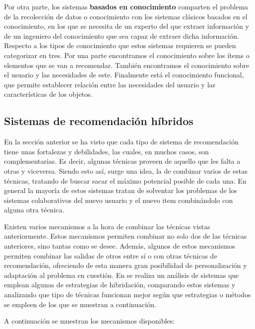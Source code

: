 Por otra parte, los sistemas \textbf{basados en conocimiento} comparten el problema de la recolección de datos o conocimiento con los sistemas clásicos basados en el conocimiento, en los que se necesita de un experto del que extraer información y de un ingeniero del conocimiento que sea capaz de extraer dicha información. Respecto a los tipos de conocimiento que estos sistemas requieren se pueden categorizar en tres. Por una parte encontramos el conocimiento sobre los ítems o elementos que se van a recomendar. También encontramos el conocimiento sobre el usuario y las necesidades de este. Finalmente está el conocimiento funcional, que permite establecer relación entre las necesidades del usuario y las características de los objetos.

\subsection{Sistemas de recomendación híbridos}
\label{sec:sistemas-hibridos}

En la sección anterior se ha visto que cada tipo de sistema de recomendación tiene unas fortalezas y debilidades, las cuales, en muchos casos, son complementarias. Es decir, algunas técnicas proveen de aquello que les falta a otras y viceversa. Siendo esto así, surge una idea, la de combinar varios de estas técnicas, tratando de buscar sacar el máximo potencial posible de cada una. En general la mayoría de estos sistemas tratan de solventar los problemas de los sistemas colaborativos del nuevo usuario y el nuevo item combinándolo con alguna otra técnica.

Existen varios mecanismos a la hora de combinar las técnicas vistas anteriormente. Estos mecanismos permiten combinar no solo dos de las técnicas anteriores, sino tantas como se desee. Además, algunos de estos mecanismos permiten combinar las salidas de otros entre sí o con otras técnicas de recomendación, ofreciendo de esta manera gran posibilidad de personalización y adaptación al problema en cuestión. En \cite{burke2007hybrid} se realiza un análisis de sistemas que emplean algunas de estrategias de hibridación, comparando estos sistemas y analizando que tipo de técnicas funcionan mejor según que estrategias o métodos se empleen de los que se muestran a continuación.

A continuación se muestran los mecanismos disponibles:

